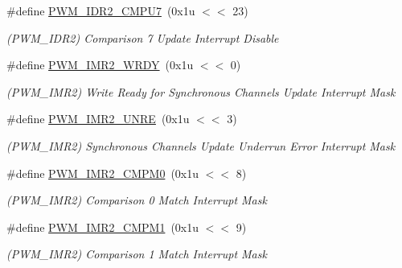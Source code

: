 \begin{DoxyCompactItemize}
\mbox{\label{group__SAMS70__PWM_gaeb08f9b69c0bb9eacf4667c27e94549b}} 
\#define \mbox{\hyperlink{group__SAMS70__PWM_gaeb08f9b69c0bb9eacf4667c27e94549b}{P\+W\+M\+\_\+\+I\+D\+R2\+\_\+\+C\+M\+P\+U7}}~(0x1u $<$$<$ 23)
\begin{DoxyCompactList}\small\item\em (P\+W\+M\+\_\+\+I\+D\+R2) Comparison 7 Update Interrupt Disable \end{DoxyCompactList}\item 
\mbox{\label{group__SAMS70__PWM_ga81e160d048da79f139239f215faa2ac7}} 
\#define \mbox{\hyperlink{group__SAMS70__PWM_ga81e160d048da79f139239f215faa2ac7}{P\+W\+M\+\_\+\+I\+M\+R2\+\_\+\+W\+R\+DY}}~(0x1u $<$$<$ 0)
\begin{DoxyCompactList}\small\item\em (P\+W\+M\+\_\+\+I\+M\+R2) Write Ready for Synchronous Channels Update Interrupt Mask \end{DoxyCompactList}\item 
\mbox{\label{group__SAMS70__PWM_ga85e7cc43a764e203d90db792459a49c7}} 
\#define \mbox{\hyperlink{group__SAMS70__PWM_ga85e7cc43a764e203d90db792459a49c7}{P\+W\+M\+\_\+\+I\+M\+R2\+\_\+\+U\+N\+RE}}~(0x1u $<$$<$ 3)
\begin{DoxyCompactList}\small\item\em (P\+W\+M\+\_\+\+I\+M\+R2) Synchronous Channels Update Underrun Error Interrupt Mask \end{DoxyCompactList}\item 
\mbox{\label{group__SAMS70__PWM_ga37414bfbc6978c6fe9b00fa217792ca5}} 
\#define \mbox{\hyperlink{group__SAMS70__PWM_ga37414bfbc6978c6fe9b00fa217792ca5}{P\+W\+M\+\_\+\+I\+M\+R2\+\_\+\+C\+M\+P\+M0}}~(0x1u $<$$<$ 8)
\begin{DoxyCompactList}\small\item\em (P\+W\+M\+\_\+\+I\+M\+R2) Comparison 0 Match Interrupt Mask \end{DoxyCompactList}\item 
\mbox{\label{group__SAMS70__PWM_ga3ea81ef42b970526d8bbd56cb4b5d423}} 
\#define \mbox{\hyperlink{group__SAMS70__PWM_ga3ea81ef42b970526d8bbd56cb4b5d423}{P\+W\+M\+\_\+\+I\+M\+R2\+\_\+\+C\+M\+P\+M1}}~(0x1u $<$$<$ 9)
\begin{DoxyCompactList}\small\item\em (P\+W\+M\+\_\+\+I\+M\+R2) Comparison 1 Match Interrupt Mask \end{DoxyCompactList}\item 
$$
\end{DoxyCompactItemize}
